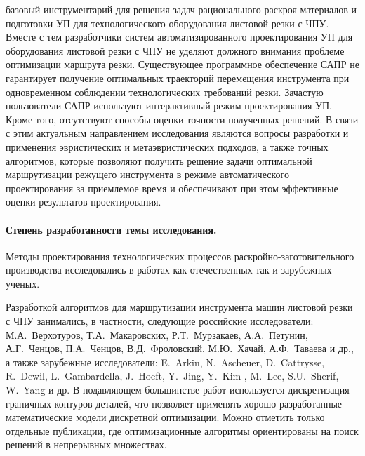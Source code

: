базовый инструментарий для решения задач рационального раскроя материалов
и подготовки УП для технологического оборудования листовой резки с ЧПУ.
Вместе с тем разработчики систем автоматизированного проектирования УП
для оборудования листовой резки с ЧПУ не уделяют должного внимания
проблеме оптимизации маршрута резки.
Существующее программное обеспечение САПР не гарантирует
получение оптимальных траекторий перемещения инструмента
при одновременном соблюдении технологических требований резки.
Зачастую пользователи САПР используют интерактивный режим проектирования УП.
Кроме того, отсутствуют способы оценки точности полученных решений.
В связи с этим актуальным направлением
исследования являются
вопросы разработки и
применения эвристических и метаэвристических подходов,
а также точных алгоритмов,
которые позволяют получить решение задачи
оптимальной маршрутизации
режущего инструмента
в режиме автоматического проектирования
за приемлемое время
и обеспечивают
при этом
эффективные оценки результатов проектирования.

\paragraph*{Степень разработанности темы исследования.}

Методы проектирования технологических процессов
раскройно-заготовительного производства
исследовались в работах как отечественных так и зарубежных ученых.

Разработкой алгоритмов для маршрутизации инструмента машин листовой резки с ЧПУ занимались,
в частности, следующие российские исследователи:
М.А.~Верхотуров, Т.А.~Макаровских, Р.Т.~Мурзакаев, А.А.~Петунин, А.Г.~Ченцов,
П.А.~Ченцов, В.Д.~Фроловский, М.Ю.~Хачай,
А.Ф.~Таваева
и др.,
а также зарубежные исследователи:
E.~Arkin, N.~Ascheuer, D.~Cattrysse, R.~Dewil, L.~Gambardella, J.~Hoeft, Y.~Jing, Y.~Kim , M.~Lee, S.U.~Sherif, W.~Yang и др.
В подавляющем большинстве работ
используется дискретизация граничных контуров деталей,
что позволяет применять хорошо разработанные математические модели дискретной оптимизации.
Можно отметить только отдельные публикации,
где оптимизационные алгоритмы ориентированы на поиск решений в непрерывных множествах.

